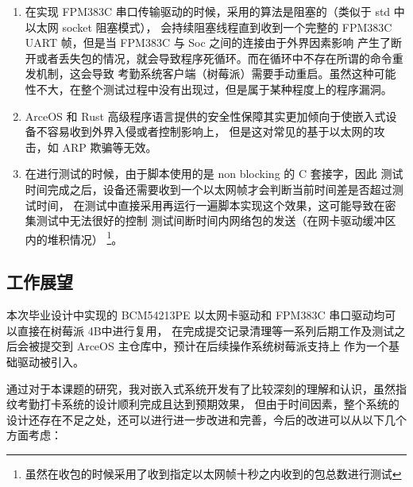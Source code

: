 \begin{enumerate}
        \item 在实现 FPM383C 串口传输驱动的时候，采用的算法是阻塞的（类似于 std 中以太网 socket 阻塞模式），
            会持续阻塞线程直到收到一个完整的 FPM383C UART 帧，但是当 FPM383C 与 Soc 之间的连接由于外界因素影响
            产生了断开或者丢失包的情况，就会导致程序死循环。而在循环中不存在所谓的命令重发机制，这会导致
            考勤系统客户端（树莓派）需要手动重启。虽然这种可能性不大，在整个测试过程中没有出现过，但是属于某种程度上的程序漏洞。
        
        \item ArceOS 和 Rust 高级程序语言提供的安全性保障其实更加倾向于使嵌入式设备不容易收到外界入侵或者控制影响上，
            但是这对常见的基于以太网的攻击，如 ARP 欺骗等无效。

        \item 在进行测试的时候，由于脚本使用的是 non blocking 的 C 套接字，因此
            测试时间完成之后，设备还需要收到一个以太网帧才会判断当前时间差是否超过测试时间，
            在测试中直接采用再运行一遍脚本实现这个效果，这可能导致在密集测试中无法很好的控制
            测试间断时间内网络包的发送（在网卡驱动缓冲区内的堆积情况）
            \footnote{虽然在收包的时候采用了收到指定以太网帧十秒之内收到的包总数进行测试}。

    \end{enumerate}

    \subsection{工作展望}

    本次毕业设计中实现的 BCM54213PE 以太网卡驱动和 FPM383C 串口驱动均可以直接在树莓派 4B中进行复用，
    在完成提交记录清理等一系列后期工作及测试之后会被提交到 ArceOS 主仓库中，预计在后续操作系统树莓派支持上
    作为一个基础驱动被引入。

    通过对于本课题的研究，我对嵌入式系统开发有了比较深刻的理解和认识，虽然指纹考勤打卡系统的设计顺利完成且达到预期效果，
    但由于时间因素，整个系统的设计还存在不足之处，还可以进行进一步改进和完善，今后的改进可以从以下几个方面考虑：

